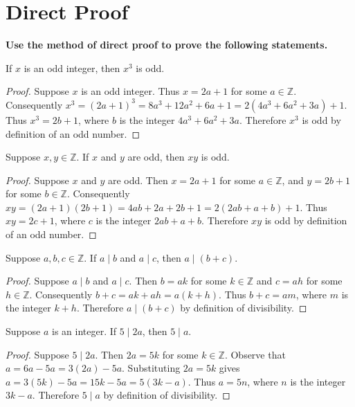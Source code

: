 \documentclass[DIN, pagenumber=false, fontsize=11pt, parskip=half]{scrartcl}
\title{}
\author{} %
\date{}
\begin{document}
\maketitle

\setcounter{section}{3}

\section{Direct Proof}

\textbf{Use the method of direct proof to prove the following statements.}

\begin{problems}
    \problem If $x$ is an odd integer, then $x^3$ is odd.
    \begin{proof}
        Suppose $x$ is an odd integer. Thus $x = 2a+1$ for some $a \in \mathbb{Z}$.
        Consequently $x^3 = (2a+1)^3 = 8a^3+12a^2+6a+1 = 2(4a^3+6a^2+3a)+1$.
        Thus $x^3 = 2b+1$, where $b$ is the integer $4a^3+6a^2+3a$.
        Therefore $x^3$ is odd by definition of an odd number.
    \end{proof}

    \problem Suppose $x,y \in \mathbb{Z}$. If $x$ and $y$ are odd, then $xy$ is odd.
    \begin{proof}
        Suppose $x$ and $y$ are odd.
        Then $x = 2a+1$ for some $a \in \mathbb{Z}$, and $y = 2b+1$ for some $b \in \mathbb{Z}$.
        Consequently $xy = (2a+1)(2b+1) = 4ab+2a+2b+1 = 2(2ab+a+b) + 1$.
        Thus $xy = 2c+1$, where $c$ is the integer $2ab+a+b$.
        Therefore $xy$ is odd by definition of an odd number.
    \end{proof}

    \problem Suppose $a,b,c \in \mathbb{Z}$. If $a \mid b$ and $a \mid c$, then $a\mid (b+c)$.
    \begin{proof}
        Suppose $a \mid b$ and $a \mid c$.
        Then $b = ak$ for some $k \in \mathbb{Z}$ and $c = ah$ for some $h \in \mathbb{Z}$.
        Consequently $b + c = ak + ah = a(k+h)$.
        Thus $b + c = am$, where $m$ is the integer $k+h$.
        Therefore $a \mid (b + c)$ by definition of divisibility.
    \end{proof}

    \problem Suppose $a$ is an integer. If $5 \mid 2a$, then $5 \mid a$.
    \begin{proof}
        Suppose $5 \mid 2a$. Then $2a = 5k$ for some $k \in \mathbb{Z}$.
        Observe that $a = 6a - 5a = 3(2a) - 5a$.
        Substituting $2a = 5k$ gives $a = 3(5k) - 5a = 15k - 5a = 5(3k - a)$.
        Thus $a = 5n$, where $n$ is the integer $3k - a$.
        Therefore $5 \mid a$ by definition of divisibility.
    \end{proof}


\end{problems}
\end{document}
